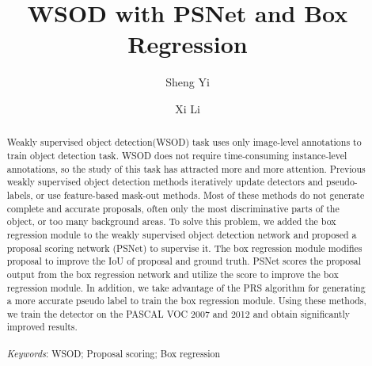 \documentclass[final,3p,times,twocolumn]{elsarticle}
\begin{document}
\begin{frontmatter}



\author{Sheng Yi}
\author{Xi Li}



\title{WSOD with PSNet and Box Regression}

\address[label1]{Department of Electronic Engineering, Tsinghua University}


\begin{abstract}
Weakly supervised object detection(WSOD) task uses only image-level annotations to train object detection task. WSOD does not require time-consuming instance-level annotations, so the study of this task has attracted more and more attention. Previous weakly supervised object detection methods iteratively update detectors and pseudo-labels, or use feature-based mask-out methods. Most of these methods do not generate complete and accurate proposals, often only the most discriminative parts of the object, or too many background areas. To solve this problem, we added the box regression module to the weakly supervised object detection network and proposed a proposal scoring network (PSNet) to supervise it. The box regression module modifies proposal to improve the IoU of proposal and ground truth. PSNet scores the proposal output from the box regression network and utilize the score to improve the box regression module. In addition, we take advantage of the PRS algorithm for generating a more accurate pseudo label to train the box regression module. Using these methods, we train the detector on the PASCAL VOC 2007 and 2012 and obtain significantly improved results.
\\
\\
\textit{Keywords}: WSOD; Proposal scoring; Box regression
\end{abstract}









\end{frontmatter}
\end{document}
